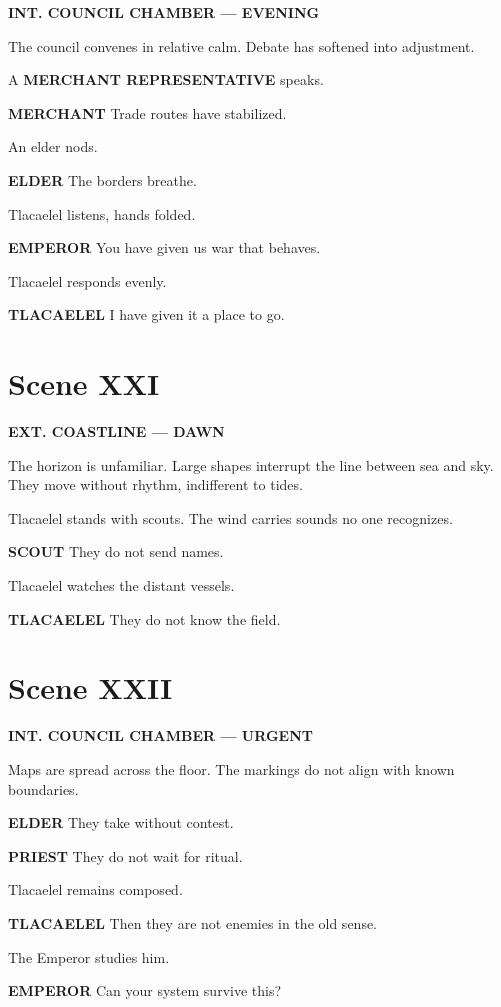 \documentclass[12pt]{article}
\begin{document}
\textbf{INT. COUNCIL CHAMBER --- EVENING}

The council convenes in relative calm. Debate has softened into adjustment.

A \textbf{MERCHANT REPRESENTATIVE} speaks.

\textbf{MERCHANT}  
Trade routes have stabilized.

An elder nods.

\textbf{ELDER}  
The borders breathe.

Tlacaelel listens, hands folded.

\textbf{EMPEROR}  
You have given us war that behaves.

Tlacaelel responds evenly.

\textbf{TLACAELEL}  
I have given it a place to go.

\section*{Scene XXI}

\textbf{EXT. COASTLINE --- DAWN}

The horizon is unfamiliar. Large shapes interrupt the line between sea and sky. They move without rhythm, indifferent to tides.

Tlacaelel stands with scouts. The wind carries sounds no one recognizes.

\textbf{SCOUT}  
They do not send names.

Tlacaelel watches the distant vessels.

\textbf{TLACAELEL}  
They do not know the field.

\section*{Scene XXII}

\textbf{INT. COUNCIL CHAMBER --- URGENT}

Maps are spread across the floor. The markings do not align with known boundaries.

\textbf{ELDER}  
They take without contest.

\textbf{PRIEST}  
They do not wait for ritual.

Tlacaelel remains composed.

\textbf{TLACAELEL}  
Then they are not enemies in the old sense.

The Emperor studies him.

\textbf{EMPEROR}  
Can your system survive this?
\end{document}
